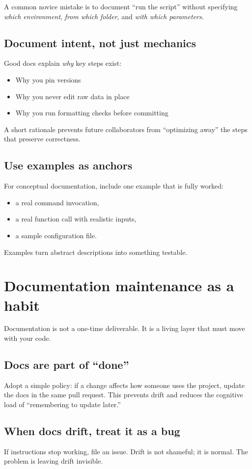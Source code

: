 A common novice mistake is to document “run the script” without specifying \emph{which environment}, \emph{from which folder}, and \emph{with which parameters}.

\subsection{Document intent, not just mechanics}
Good docs explain \emph{why} key steps exist:
\begin{itemize}[noitemsep]
  \item Why you pin versions
  \item Why you never edit raw data in place
  \item Why you run formatting checks before committing
\end{itemize}

A short rationale prevents future collaborators from “optimizing away” the steps that preserve correctness.

\subsection{Use examples as anchors}
For conceptual documentation, include one example that is fully worked:
\begin{itemize}[noitemsep]
  \item a real command invocation,
  \item a real function call with realistic inputs,
  \item a sample configuration file.
\end{itemize}

Examples turn abstract descriptions into something testable.

\section{Documentation maintenance as a habit}
Documentation is not a one-time deliverable. It is a living layer that must move with your code.

\subsection{Docs are part of “done”}
Adopt a simple policy: if a change affects how someone uses the project, update the docs in the same pull request. This prevents drift and reduces the cognitive load of “remembering to update later.”

\subsection{When docs drift, treat it as a bug}
If instructions stop working, file an issue. Drift is not shameful; it is normal. The problem is leaving drift invisible.

